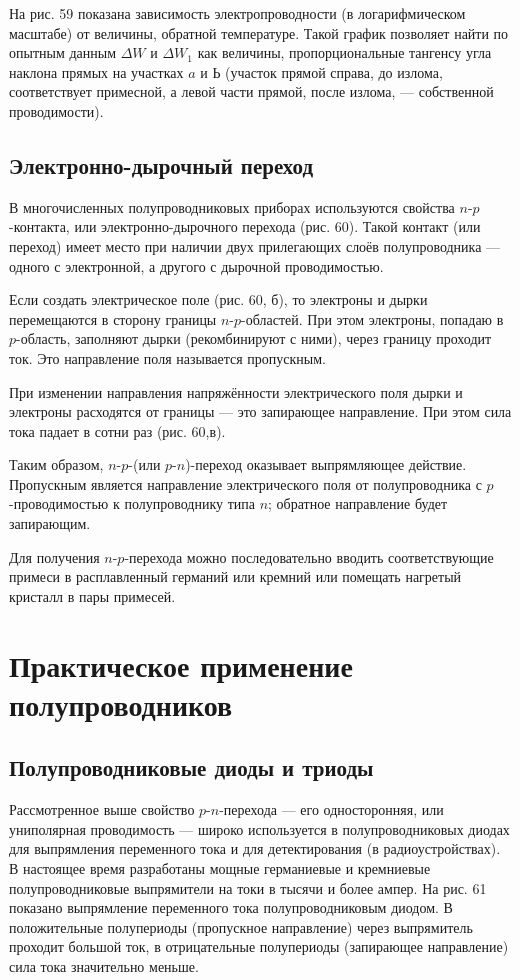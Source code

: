 \documentclass[a4paper,10pt]{book}
\begin{document}
На рис. 59 показана зависимость электропроводности (в логарифмическом масштабе) от величины, обратной температуре. Такой график позволяет найти по опытным данным $\Delta W$ и $\Delta W_1$ как величины, пропорциональные тангенсу угла наклона прямых на участках $a$ и $Ь$ (участок прямой справа, до излома, соответствует примесной, а левой части прямой, после излома, — собственной проводимости).

\section{Электронно-дырочный переход}

В многочисленных полупроводниковых приборах используются свойства $n$-$p$-контакта, или электронно-дырочного перехода (рис. 60). Такой контакт (или переход) имеет место при наличии двух прилегающих слоёв полупроводника — одного с электронной, а другого с дырочной проводимостью.

Если создать электрическое поле (рис. 60, $\textit{б}$), то электроны и дырки перемещаются в сторону границы $n$-$p$-областей. При этом электроны, попадаю в $p$-область, заполняют дырки (рекомбинируют с ними), через границу проходит ток. Это направление поля называется пропускным.

При изменении направления напряжённости электрического поля дырки и электроны расходятся от границы — это запирающее направление. При этом сила тока падает в сотни раз (рис. 60,$\textit{в}$).

Таким образом, $n$-$p$-(или $p$-$n$)-переход оказывает выпрямляющее действие. Пропускным является направление электрического поля от полупроводника с $p$-проводимостью к полупроводнику типа $n$; обратное направление будет запирающим.

Для получения $n$-$p$-перехода можно последовательно вводить соответствующие примеси в расплавленный германий или кремний или помещать нагретый кристалл в пары примесей.

\chapter{Практическое применение полупроводников}
\section{Полупроводниковые диоды и триоды}

Рассмотренное выше свойство $p$-$n$-перехода — его односторонняя, или униполярная проводимость — широко используется в полупроводниковых диодах для выпрямления переменного тока и для детектирования (в радиоустройствах). В настоящее время разработаны мощные германиевые и кремниевые полупроводниковые выпрямители на токи в тысячи и более ампер. На рис. 61 показано выпрямление переменного тока полупроводниковым диодом. В положительные полупериоды (пропускное направление) через выпрямитель проходит большой ток, в отрицательные полупериоды (запирающее направление) сила тока значительно меньше.
\end{document}
